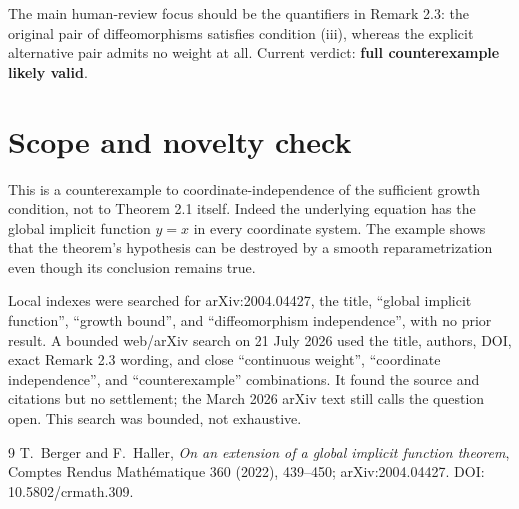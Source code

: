 \documentclass[11pt]{article}
\begin{document}
The main human-review focus should be the quantifiers in Remark 2.3: the
original pair of diffeomorphisms satisfies condition (iii), whereas the
explicit alternative pair admits no weight at all.  Current verdict:
\textbf{full counterexample likely valid}.

\section{Scope and novelty check}

This is a counterexample to coordinate-independence of the sufficient growth
condition, not to Theorem 2.1 itself.  Indeed the underlying equation has the
global implicit function $y=x$ in every coordinate system.  The example shows
that the theorem's hypothesis can be destroyed by a smooth reparametrization
even though its conclusion remains true.

Local indexes were searched for arXiv:2004.04427, the title, ``global implicit
function'', ``growth bound'', and ``diffeomorphism independence'', with no
prior result.  A bounded web/arXiv search on 21 July 2026 used the title,
authors, DOI, exact Remark 2.3 wording, and close ``continuous weight'',
``coordinate independence'', and ``counterexample'' combinations.  It found
the source and citations but no settlement; the March 2026 arXiv text still
calls the question open.  This search was bounded, not exhaustive.

\enlargethispage{2\baselineskip}
\begin{thebibliography}{9}
T.~Berger and F.~Haller,
\emph{On an extension of a global implicit function theorem},
Comptes Rendus Math\'ematique 360 (2022), 439--450;
arXiv:2004.04427.  DOI: 10.5802/crmath.309.
\end{thebibliography}
\end{document}
